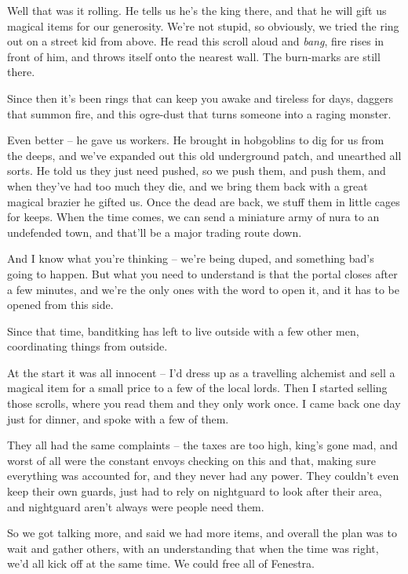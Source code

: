 \begin{multicols}{2}
\begin{exampletext}
	Well that was it rolling.  He tells us he's the king there, and that he will gift us magical items for our generosity.  We're not stupid, so obviously, we tried the ring out on a street kid from above.  He read this scroll aloud and \emph{bang}, fire rises in front of him, and throws itself onto the nearest wall.  The burn-marks are still there.

	Since then it's been rings that can keep you awake and tireless for days, daggers that summon fire, and this ogre-dust that turns someone into a raging monster.

	Even better -- he gave us workers.
	He brought in hobgoblins to dig for us from the deeps, and we've expanded out this old underground patch, and unearthed all sorts.
	He told us they just need pushed, so we push them, and push them, and when they've had too much they die, and we bring them back with a great magical brazier he gifted us.
	Once the dead are back, we stuff them in little cages for keeps.
	When the time comes, we can send a miniature army of nura to an undefended town, and that'll be a major trading route down.

	And I know what you're thinking -- we're being duped, and something bad's going to happen.  But what you need to understand is that the portal closes after a few minutes, and we're the only ones with the word to open it, and it has to be opened from this side.

\end{exampletext}

Since that time, \gls{banditking} has left to live outside with a few other men, coordinating things from outside.

\begin{exampletext}

	At the start it was all innocent -- I'd dress up as a travelling alchemist and sell a magical item for a small price to a few of the local lords.  Then I started selling those scrolls, where you read them and they only work once.  I came back one day just for dinner, and spoke with a few of them.

	They all had the same complaints -- the taxes are too high, \gls{king}'s gone mad, and worst of all were the constant envoys checking on this and that, making sure everything was accounted for, and they never had any power.
	They couldn't even keep their own guards, just had to rely on \gls{nightguard} to look after their area, and \gls{nightguard} aren't always were people need them.

	So we got talking more, and said we had more items, and overall the plan was to wait and gather others, with an understanding that when the time was right, we'd all kick off at the same time.  We could free all of Fenestra.


\end{exampletext}
\end{multicols}
